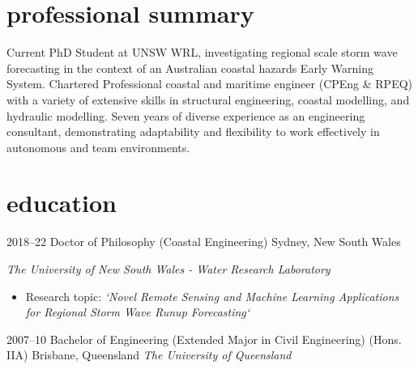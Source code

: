 \documentclass[print]{friggeri}
\begin{document}
\vspace{0.1cm} %



\section{professional summary}
\begin{adjustwidth}{2cm}{}
  Current PhD Student at UNSW WRL, investigating regional scale storm wave forecasting in the context of an Australian coastal hazards Early Warning System.
  Chartered Professional coastal and maritime engineer (CPEng \& RPEQ) with a variety of extensive skills in structural engineering, coastal modelling, and hydraulic modelling.
  Seven years of diverse experience as an engineering consultant, demonstrating adaptability and flexibility to work effectively in autonomous and team environments.\\
  \vspace{-2\parskip}
\end{adjustwidth}


%   
%   



\section{education}
\begin{entrylist}
\entry%
{2018--22}
{Doctor of Philosophy {\normalfont (Coastal Engineering)}}%
{Sydney, New South Wales}
{\emph{The University of New South Wales - Water Research Laboratory}
  \begin{itemize}
  \item Research topic: \textit{`Novel Remote Sensing and Machine Learning Applications for Regional Storm Wave Runup Forecasting`}
  \end{itemize}
}

\entry%
{2007--10}
{Bachelor of Engineering {\normalfont (Extended Major in Civil Engineering) (Hons. IIA)}}%
{Brisbane, Queensland}
{\emph{The University of Queensland}
}
\end{entrylist}
\end{document}
